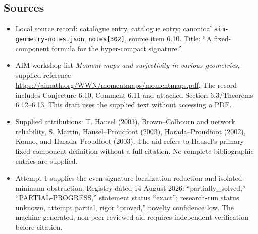\documentclass[11pt]{article}
\begin{document}
\subsection{Sources}
\begin{itemize}
\item Local source record: catalogue entry, catalogue entry; canonical \texttt{aim-geometry-notes.json}, \texttt{notes[302]}, source item 6.10. Title: ``A fixed-component formula for the hyper-compact signature.''
\item AIM workshop list \emph{Moment maps and surjectivity in various geometries}, supplied reference \url{https://aimath.org/WWN/momentmaps/momentmaps.pdf}. The record includes Conjecture 6.10, Comment 6.11 and attached Section 6.3/Theorems 6.12--6.13. This draft uses the supplied text without accessing a PDF.
\item Supplied attributions: T. Hausel (2003), Brown--Colbourn and network reliability, S. Martin, Hausel--Proudfoot (2003), Harada--Proudfoot (2002), Konno, and Harada--Proudfoot (2003). The aid refers to Hausel's primary fixed-component definition without a full citation. No complete bibliographic entries are supplied.
\item Attempt 1 supplies the even-signature localization reduction and isolated-minimum obstruction. Registry dated 14 August 2026: ``partially\_solved,'' ``PARTIAL-PROGRESS,'' statement status ``exact''; research-run status unknown, attempt partial, rigor ``proved,'' novelty confidence low. The machine-generated, non-peer-reviewed aid requires independent verification before citation.
\end{itemize}
\end{document}
